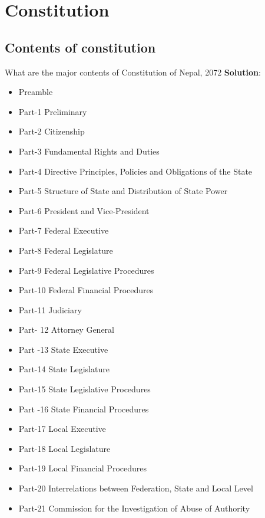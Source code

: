 \documentclass[
  openany]{book}
\newcommand{\question}{\item}
\newenvironment{solution}{ {\bfseries Solution}:}{}
\begin{document}
\hypertarget{constitution}{%
\chapter{Constitution}\label{constitution}}

\hypertarget{contents-of-constitution}{%
\section{Contents of constitution}\label{contents-of-constitution}}

\begin{questions}
\question What are the major contents of Constitution of Nepal, 2072
  \begin{solution}
  \begin{itemize}
  \item Preamble
  \item Part-1 Preliminary
  \item Part-2 Citizenship
  \item Part-3 Fundamental Rights and Duties
  \item Part-4 Directive Principles, Policies and Obligations of the State
  \item Part-5 Structure of State and Distribution of State Power
  \item Part-6 President and Vice-President
  \item Part-7 Federal Executive
  \item Part-8 Federal Legislature
  \item Part-9 Federal Legislative Procedures
  \item Part-10 Federal Financial Procedures
  \item Part-11 Judiciary
  \item Part- 12 Attorney General
  \item Part -13 State Executive
  \item Part-14 State Legislature
  \item Part-15 State Legislative Procedures
  \item Part -16 State Financial Procedures
  \item Part-17 Local Executive
  \item Part-18 Local Legislature
  \item Part-19 Local Financial Procedures
  \item Part-20 Interrelations between Federation, State and Local Level
  \item Part-21 Commission for the Investigation of Abuse of Authority

\end{itemize}
\end{solution}
\end{questions}
\end{document}
